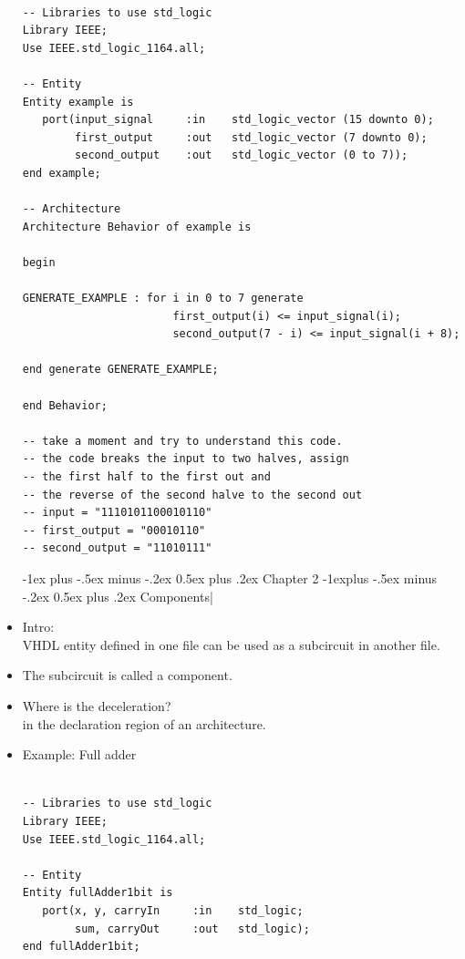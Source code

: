 \documentclass[a4paper]{article}
\makeatletter
\renewcommand{\section}{\@startsection{section}{1}{0mm}%
                                {-1ex plus -.5ex minus -.2ex}%
                                {0.5ex plus .2ex}%
                                {\normalfont\large\bfseries}}
\renewcommand{\subsection}{\@startsection{subsection}{2}{0mm}%
                                {-1explus -.5ex minus -.2ex}%
                                {0.5ex plus .2ex}%
                                {\normalfont\normalsize\bfseries}}
\makeatother
\begin{document}
\begin{itemize}
\begin{verbatim}

-- Libraries to use std_logic
Library IEEE;
Use IEEE.std_logic_1164.all;

-- Entity
Entity example is 
   port(input_signal     :in    std_logic_vector (15 downto 0);
        first_output     :out   std_logic_vector (7 downto 0);
        second_output    :out   std_logic_vector (0 to 7));
end example;

-- Architecture
Architecture Behavior of example is

begin

GENERATE_EXAMPLE : for i in 0 to 7 generate
                       first_output(i) <= input_signal(i);
                       second_output(7 - i) <= input_signal(i + 8);

end generate GENERATE_EXAMPLE;

end Behavior;

-- take a moment and try to understand this code.
-- the code breaks the input to two halves, assign 
-- the first half to the first out and
-- the reverse of the second halve to the second out
-- input = "1110101100010110"
-- first_output = "00010110"
-- second_output = "11010111"
\end{verbatim}

\section{Chapter 2}
\subsection{Components}|

\item Intro:\\
VHDL entity defined in one file can be used as a subcircuit in another file.
\item The subcircuit is called a component.
\item Where is the deceleration?\\
 in the declaration region of an architecture.

\item Example: Full adder
\begin{verbatim}

-- Libraries to use std_logic
Library IEEE;
Use IEEE.std_logic_1164.all;

-- Entity
Entity fullAdder1bit is 
   port(x, y, carryIn     :in    std_logic;
        sum, carryOut     :out   std_logic);
end fullAdder1bit;


\end{verbatim}
\end{itemize}
\end{document}
